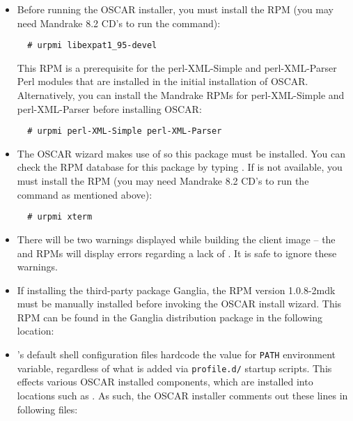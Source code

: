 \begin{itemize}
\item Before running the OSCAR installer, you must install the
   RPM (you may need Mandrake 8.2 CD's to run
  the  command):

\begin{verbatim}
  # urpmi libexpat1_95-devel
\end{verbatim}

  This RPM is a prerequisite for the perl-XML-Simple and
  perl-XML-Parser Perl modules that are installed in the initial
  installation of OSCAR.  Alternatively, you can install the Mandrake
  RPMs for perl-XML-Simple and perl-XML-Parser before installing
  OSCAR:

\begin{verbatim}
  # urpmi perl-XML-Simple perl-XML-Parser
\end{verbatim}


\item The OSCAR wizard makes use of  so this package must be
  installed.  You can check the RPM database for this package by typing
  .  If  is not available, you must
  install the  RPM (you may need Mandrake 8.2
  CD's to run the  command as mentioned above):

\begin{verbatim}
  # urpmi xterm
\end{verbatim}


\item There will be two warnings displayed while building the client
  image -- the  and  RPMs will
  display errors regarding a lack of .  It is safe
  to ignore these warnings.
  
\item If installing the third-party package Ganglia, the
   RPM version 1.0.8-2mdk must be manually installed
  before invoking the OSCAR install wizard.  This RPM can be
  found in the Ganglia distribution package in the following location:\\
  
\item {}'s default shell configuration files hardcode the
  value for {\tt PATH} environment variable, regardless of what is
  added via {\tt profile.d/} startup scripts.  This effects various
  OSCAR installed components, which are installed into locations such
  as .  As such, the OSCAR installer comments out these
  lines in following files:


\end{itemize}
